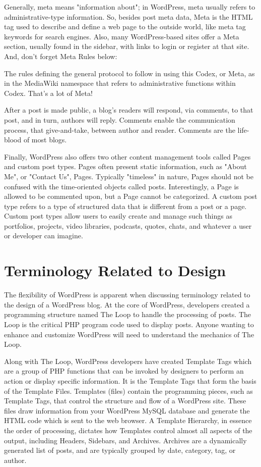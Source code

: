 Generally, meta means "information about"; in WordPress, meta usually refers to administrative-type information. So, besides post meta data, Meta is the HTML tag used to describe and define a web page to the outside world, like meta tag keywords for search engines. Also, many WordPress-based sites offer a Meta section, usually found in the sidebar, with links to login or register at that site. And, don't forget Meta Rules below:

The rules defining the general protocol to follow in using this Codex, or Meta, as in the MediaWiki namespace that refers to administrative functions within Codex. That's a lot of Meta!

After a post is made public, a blog's readers will respond, via comments, to that post, and in turn, authors will reply. Comments enable the communication process, that give-and-take, between author and reader. Comments are the life-blood of most blogs.

Finally, WordPress also offers two other content management tools called Pages and custom post types. Pages often present static information, such as "About Me", or "Contact Us", Pages. Typically "timeless" in nature, Pages should not be confused with the time-oriented objects called posts. Interestingly, a Page is allowed to be commented upon, but a Page cannot be categorized. A custom post type refers to a type of structured data that is different from a post or a page. Custom post types allow users to easily create and manage such things as portfolios, projects, video libraries, podcasts, quotes, chats, and whatever a user or developer can imagine.

\section{Terminology Related to Design}

The flexibility of WordPress is apparent when discussing terminology related to the design of a WordPress blog. At the core of WordPress, developers created a programming structure named The Loop to handle the processing of posts. The Loop is the critical PHP program code used to display posts. Anyone wanting to enhance and customize WordPress will need to understand the mechanics of The Loop.

Along with The Loop, WordPress developers have created Template Tags which are a group of PHP functions that can be invoked by designers to perform an action or display specific information. It is the Template Tags that form the basis of the Template Files. Templates (files) contain the programming pieces, such as Template Tags, that control the structure and flow of a WordPress site. These files draw information from your WordPress MySQL database and generate the HTML code which is sent to the web browser. A Template Hierarchy, in essence the order of processing, dictates how Templates control almost all aspects of the output, including Headers, Sidebars, and Archives. Archives are a dynamically generated list of posts, and are typically grouped by date, category, tag, or author.


